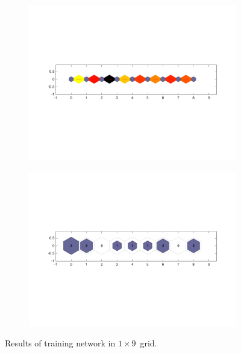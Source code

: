     \begin{figure}
        \begin{subfigure}[b]{0.5\textwidth}
            \centering
            \includegraphics[width=\textwidth]{../images/1d/apps/dist_1_by_9.png}
        \end{subfigure}
        \hfill
        \begin{subfigure}[b]{0.5\textwidth}
             \includegraphics[width=\textwidth]{../images/1d/apps/hit_t_1_by_9.png}
        \end{subfigure}
                \caption{Results of training network in $1\times9$~grid.}
         \label{fig: 1by9T}
    \end{figure}

